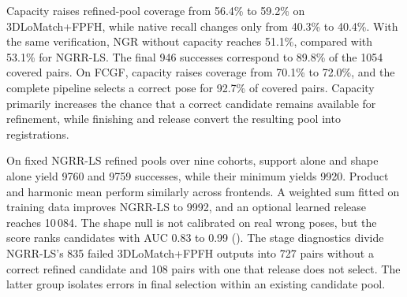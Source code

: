 Capacity raises refined-pool coverage from 56.4\% to 59.2\% on 3DLoMatch+FPFH, while native recall changes only from 40.3\% to 40.4\%. With the same verification, NGR without capacity reaches 51.1\%, compared with 53.1\% for NGRR-LS. The final 946 successes correspond to 89.8\% of the 1054 covered pairs. On FCGF, capacity raises coverage from 70.1\% to 72.0\%, and the complete pipeline selects a correct pose for 92.7\% of covered pairs. Capacity primarily increases the chance that a correct candidate remains available for refinement, while finishing and release convert the resulting pool into registrations.

On fixed NGRR-LS refined pools over nine cohorts, support alone and shape alone yield 9760 and 9759 successes, while their minimum yields 9920. Product and harmonic mean perform similarly across frontends. A weighted sum fitted on training data improves NGRR-LS to 9992, and an optional learned release reaches 10\,084. The shape null is not calibrated on real wrong poses, but the score ranks candidates with AUC 0.83 to 0.99 (). The stage diagnostics divide NGRR-LS's 835 failed 3DLoMatch+FPFH outputs into 727 pairs without a correct refined candidate and 108 pairs with one that release does not select. The latter group isolates errors in final selection within an existing candidate pool.
